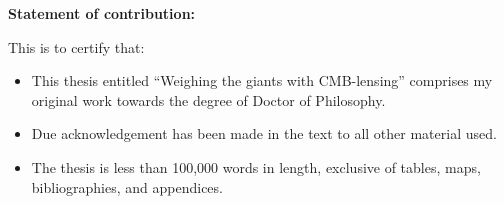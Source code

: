 


\bfseries{Statement of contribution:}\mdseries\\
\vspace{1.0cm}

This is to certify that:\\

\begin{itemize}

\item This thesis entitled ``Weighing the giants with CMB-lensing'' comprises my  original work towards the degree of Doctor of Philosophy.

\item Due acknowledgement has been made in the text to all other material used.

\item The thesis is less than 100,000 words in length, exclusive of tables, maps, bibliographies, and appendices.

\end{itemize}

\vspace{4.0cm}



